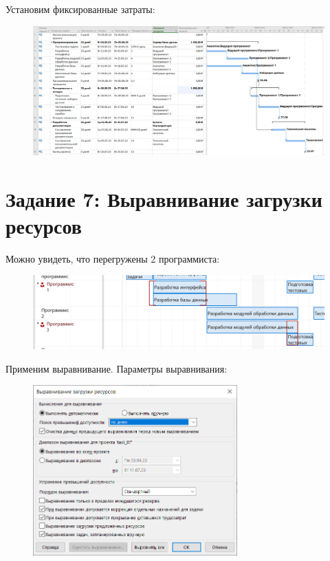 Установим фиксированные затраты:

\begin{figure}[H]
	\begin{center}
		\includegraphics[width=\textwidth]{imgs/task_6_1.png}
	\end{center}
\end{figure}

\section*{Задание 7: Выравнивание загрузки ресурсов}

Можно увидеть, что перегружены 2 программиста:

\begin{figure}[H]
	\begin{center}
		\includegraphics[width=\textwidth]{imgs/task_7_0.png}
	\end{center}
\end{figure}

Применим выравнивание. Параметры выравнивания:

\begin{figure}[H]
	\begin{center}
		\includegraphics[width=0.7\textwidth]{imgs/task_7_1.png}
	\end{center}
\end{figure}

